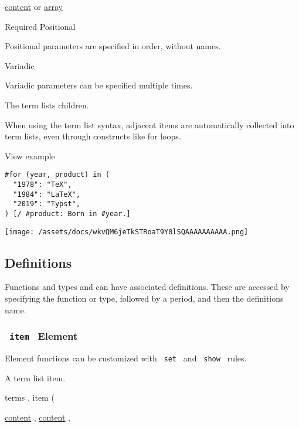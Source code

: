 \href{/docs/reference/foundations/content/}{content} {or}
\href{/docs/reference/foundations/array/}{array}

{Required} {{ Positional }}

\label{parameters-children-positional-tooltip}
Positional parameters are specified in order, without names.

{{ Variadic }}

\label{parameters-children-variadic-tooltip}
Variadic parameters can be specified multiple times.

The term list\textquotesingle s children.

When using the term list syntax, adjacent items are automatically
collected into term lists, even through constructs like for loops.


View example

\begin{verbatim}
#for (year, product) in (
  "1978": "TeX",
  "1984": "LaTeX",
  "2019": "Typst",
) [/ #product: Born in #year.]
\end{verbatim}

\texttt{[image: /assets/docs/wkvQM6jeTkSTRoaT9Y0lSQAAAAAAAAAA.png]}

\subsection{\texorpdfstring{{ Definitions
}}{ Definitions }}\label{definitions}

\label{definitions-tooltip}
Functions and types and can have associated definitions. These are
accessed by specifying the function or type, followed by a period, and
then the definition\textquotesingle s name.

\subsubsection{\texorpdfstring{\texttt{\ item\ } {{ Element
}}}{ item   Element }}\label{definitions-item}

\label{definitions-item-element-tooltip}
Element functions can be customized with \texttt{\ set\ } and
\texttt{\ show\ } rules.

A term list item.

terms { . } { item } (

{ \href{/docs/reference/foundations/content/}{content} , } {
\href{/docs/reference/foundations/content/}{content} , }

